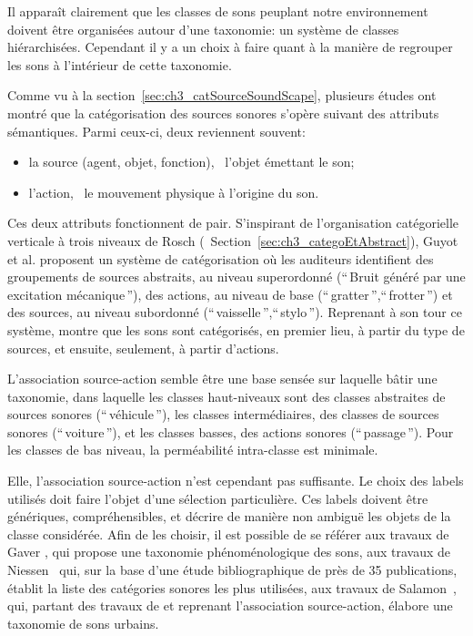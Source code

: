 Il apparaît clairement que les classes de sons peuplant notre environnement doivent être organisées autour d'une taxonomie: un système de classes hiérarchisées. Cependant il y a un choix à faire quant à la manière de regrouper les sons à l'intérieur de cette taxonomie.

Comme vu à la section~\ref{sec:ch3_catSourceSoundScape}, plusieurs études ont montré que la catégorisation des sources sonores s'opère suivant des attributs sémantiques. Parmi ceux-ci, deux reviennent souvent:

\begin{itemize}
\item la source (agent, objet, fonction), \ie~l'objet émettant le son;
\item l'action, \ie~le mouvement physique à l'origine du son.
\end{itemize} 

Ces deux attributs fonctionnent de pair. S'inspirant de l'organisation catégorielle verticale à trois niveaux de Rosch (\cf~Section~\ref{sec:ch3_categoEtAbstract}), Guyot et al. \citep{guyot1997} proposent un système de catégorisation où les auditeurs identifient des groupements de sources abstraits, au niveau superordonné (``\,Bruit généré par une excitation mécanique\,''), des actions, au niveau de base (``\,gratter\,'',``\,frotter\,'') et des sources, au niveau subordonné (``\,vaisselle\,'',``\,stylo\,''). Reprenant à son tour ce système, \citep{houix_lexical_2012} montre que les sons sont catégorisés, en premier lieu, à partir du type de sources, et ensuite, seulement, à partir d'actions.

L'association source-action semble être une base sensée sur laquelle bâtir une taxonomie, dans laquelle les classes haut-niveaux sont des classes abstraites de sources sonores (``\,véhicule\,''), les classes intermédiaires, des classes de sources sonores (``\,voiture\,''), et les classes basses, des actions sonores (``\,passage\,''). Pour les classes de bas niveau, la perméabilité intra-classe est minimale.

Elle, l'association source-action n'est cependant pas suffisante. Le choix des labels utilisés doit faire l'objet d'une sélection particulière. Ces labels doivent être génériques, compréhensibles, et décrire de manière non ambiguë les objets de la classe considérée. Afin de les choisir, il est possible de se référer aux travaux de Gaver \citep{gaver1993world}, qui propose une taxonomie phénoménologique des sons, aux travaux de Niessen~\al \citep{niessen2010categories} qui, sur la base d'une étude bibliographique de près de 35 publications, établit la liste des catégories sonores les plus utilisées, aux travaux de Salamon~\al \citep{Salamon14}, qui, partant des travaux de \citep{brown2011towards} et reprenant l'association source-action, élabore une taxonomie de sons urbains.

